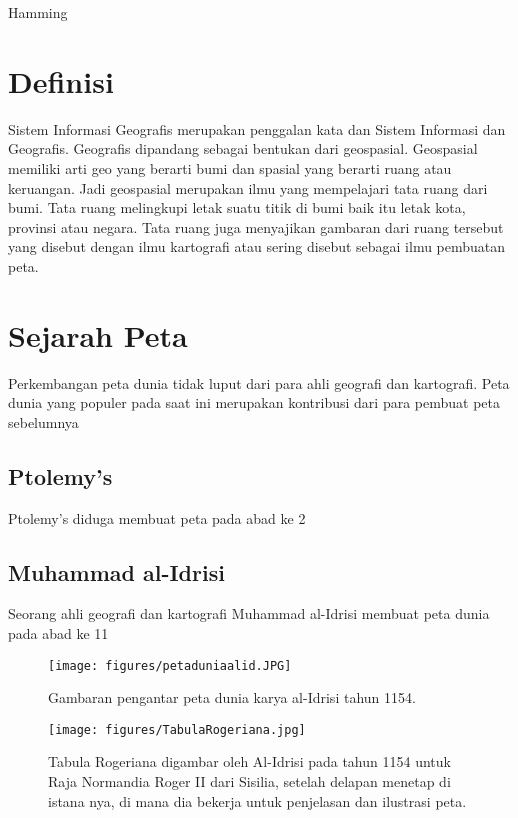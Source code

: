 {Hamming}

\section{Definisi}
Sistem Informasi Geografis merupakan penggalan kata dan Sistem Informasi dan Geografis. Geografis dipandang sebagai bentukan dari geospasial.
Geospasial memiliki arti geo yang berarti bumi dan spasial yang berarti ruang atau keruangan. Jadi geospasial merupakan ilmu yang mempelajari 
tata ruang dari bumi. Tata ruang melingkupi letak suatu titik di bumi baik itu letak kota, provinsi atau negara. Tata ruang juga menyajikan gambaran dari ruang tersebut yang disebut dengan ilmu kartografi atau sering disebut sebagai ilmu pembuatan peta\cite{IEEEhowto:IEEEtranpage}.

\section{Sejarah Peta}
Perkembangan peta dunia tidak luput dari para ahli geografi dan kartografi. Peta dunia yang populer pada saat ini merupakan kontribusi dari para 
pembuat peta sebelumnya

\subsection{Ptolemy's}
Ptolemy's diduga membuat peta pada abad ke 2


\subsection{Muhammad al-Idrisi}
Seorang ahli geografi dan kartografi Muhammad al-Idrisi membuat peta dunia pada abad ke 11

\begin{figure}[ht]

\centerline{\texttt{[image: figures/petaduniaalid.JPG]}}
\caption{Gambaran pengantar peta dunia karya al-Idrisi tahun 1154.}
\end{figure}

\begin{figure}[ht]
	\centerline{\texttt{[image: figures/TabulaRogeriana.jpg]}}
\vskip2pt
\caption{Tabula Rogeriana digambar oleh Al-Idrisi pada tahun 1154 untuk Raja Normandia Roger II dari Sisilia, setelah delapan menetap di istana nya, di mana dia bekerja untuk penjelasan dan ilustrasi peta.}
\end{figure}

